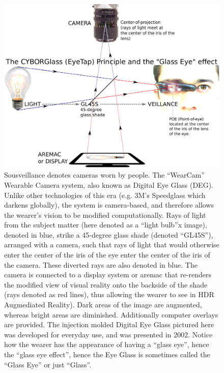 \begin{figure}[h]
\centering
\includegraphics[width=5.0in]{ch4/diagrams/eyetap_g4_ebook.pdf}
\caption{
         Sousveillance denotes cameras worn by people.
         The ``WearCam'' Wearable Camera system, also known as
          Digital Eye Glass (DEG).
         Unlike other technologies of this era (e.g. 3M's Speedglass which
         darkens globally), the system is camera-based, and therefore allows the wearer's vision to be modified
         computationally. 
         Rays of light from the subject matter (here denoted as a ``light bulb''x
         image), denoted in blue, strike a 45-degree glass shade (denoted ``GL45S''),
         arranged with a camera, such that rays of light that would otherwise
         enter the center of the iris of the eye enter the center of the iris
         of the camera.  These diverted rays are also denoted in blue.
         The camera is connected to a display system or aremac
         that re-renders the modified view of visual reality onto the backside
         of the shade (rays denoted as red lines), thus allowing the wearer
         to see in HDR Augmediated Reality).  Dark areas of the image are
         augmented, whereas bright areas are
         diminished.  Additionally computer overlays are provided.
         The injection molded Digital Eye Glass pictured here was developed
         for everyday use, and was presented in 2002.
         Notice how the wearer has the appearance of having a ``glass eye'',
         hence the ``glass eye effect''\cite{presenceconnect}, hence the
         Eye Glass is sometimes called the ``Glass Eye'' or just ``Glass''.
        }
\label{fig:deg}
\end{figure}

